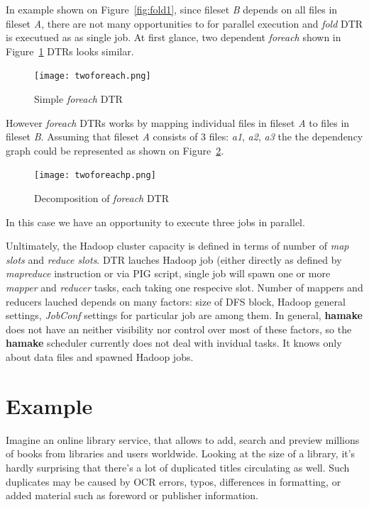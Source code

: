 \documentclass[10pt,conference,letterpaper]{IEEEtran}
\begin{document}
In example shown on Figure~\ref{fig:fold1}, since fileset \textit{B}
depends on all files in fileset \textit{A}, there are not many
opportunities to for parallel execution and \emph{fold} DTR is
executued as as single job. At first glance, two dependent
\emph{foreach} shown in Figure~\ref{fig:foreach1} DTRs looks similar.

\begin{figure}[htp]
\centering
\texttt{[image: twoforeach.png]}
\caption{Simple \emph{foreach} DTR}
\label{fig:foreach1}
\end{figure}

However \emph{foreach} DTRs works by mapping individual files in
fileset \textit{A} to files in fileset \textit{B}. Assuming that
fileset \textit{A} consists of 3 files: \textit{a1}, \textit{a2},
\textit{a3} the the dependency graph could be represented as shown on
Figure~\ref{fig:foreach2}.

\begin{figure}[htp]
\centering
\texttt{[image: twoforeachp.png]}
\caption{Decomposition of \emph{foreach} DTR}
\label{fig:foreach2}
\end{figure}

In this case we have an opportunity to execute three jobs in parallel.

Unltimately, the Hadoop cluster capacity is defined in terms of number
of \textit{map slots} and \textit{reduce slots}.  DTR lauches Hadoop
job (either directly as defined by \emph{mapreduce} instruction or via
PIG script, single job will spawn one or more \emph{mapper} and
\emph{reducer} tasks, each taking one respecive slot. Number of
mappers and reducers lauched depends on many factors: size of DFS
block, Hadoop general settings, \emph{JobConf} settings for particular
job are among them. In general, \textbf{hamake} does not have an neither
visibility nor control over most of these factors, so the \textbf{hamake}
scheduler currently does not deal with invidual tasks. It knows only
about data files and spawned Hadoop jobs.

\section{Example}

Imagine an online library service, that allows to add, search and
preview millions of books from libraries and users worldwide. Looking
at the size of a library, it's hardly surprising that there's a lot of
duplicated titles circulating as well. Such duplicates may be caused
by OCR errors, typos, differences in formatting, or added material such as
foreword or publisher information.
\end{document}
